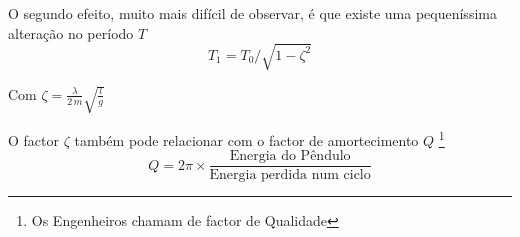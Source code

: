 \documentclass[a4paper,twoside,12pt]{article}      %
\begin{document}
O segundo efeito, muito mais difícil de observar, é que existe uma pequeníssima alteração no período $T$
\begin{equation}
T_1= T_0 / \sqrt{1 - \zeta^2} 
\end{equation}

Com $ \zeta = \frac{\lambda}{2\, m} \sqrt{\frac{l}{g}}  $

O factor  $ \zeta $ também pode relacionar com o factor de amortecimento $Q$ \footnote{Os Engenheiros chamam de factor de Qualidade} 
\begin{equation}
Q = 2 \pi \times \frac{\text{Energia do Pêndulo}}{\text{Energia perdida num ciclo}}
\end{equation}




\end{document}
